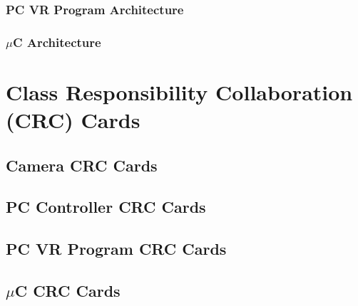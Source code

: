 \documentclass[titlepage]{article}
\begin{document}
\subsubsection{PC VR Program Architecture}
\subsubsection{$\mu$C Architecture}


\section{Class Responsibility Collaboration (CRC) Cards}
\subsection{Camera CRC Cards}
\subsection{PC Controller CRC Cards}
\subsection{PC VR Program CRC Cards}
\subsection{$\mu$C CRC Cards}


\pagebreak
\printindex
\end{document}
